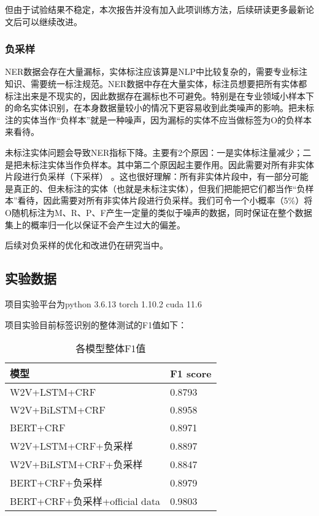 \documentclass{article}
\begin{document}
但由于试验结果不稳定，本次报告并没有加入此项训练方法，后续研读更多最新论文后可以继续改进。

\subsubsection{负采样}
NER数据会存在大量漏标，实体标注应该算是NLP中比较复杂的，需要专业标注知识、需要统一标注规范。NER数据中存在大量实体，标注员想要把所有实体都标注出来是不现实的，因此数据存在漏标也不可避免。特别是在专业领域小样本下的命名实体识别，在本身数据量较小的情况下更容易收到此类噪声的影响。把未标注的实体当作“负样本”就是一种噪声，因为漏标的实体不应当做标签为O的负样本来看待。

未标注实体问题会导致NER指标下降。主要有2个原因：一是实体标注量减少；二是把未标注实体当作负样本。其中第二个原因起主要作用。因此需要对所有非实体片段进行负采样（下采样）\cite{li2020empirical} 。这也很好理解：所有非实体片段中，有一部分可能是真正的、但未标注的实体（也就是未标注实体），但我们把能把它们都当作“负样本”看待，因此需要对所有非实体片段进行负采样。我们可令一个小概率（5\%）将O随机标注为M、R、P、F产生一定量的类似于噪声的数据，同时保证在整个数据集上的概率归一化以保证不会产生过大的偏差。

后续对负采样的优化和改进仍在研究当中。

\newpage
\begin{center}
	\section{实验数据}
\end{center}

项目实验平台为python 3.6.13 torch 1.10.2 cuda 11.6

项目实验目前标签识别的整体测试的F1值如下：


\begin{center} 
\begin{table}[h]
	\centering
	\begin{tabular}{l|p{5cm}}
		\hline
		模型&F1 score\\
		\hline
 		W2V+LSTM+CRF&0.8793\\
 		W2V+BiLSTM+CRF&0.8958\\
 		BERT+CRF&0.8971\\
 		W2V+LSTM+CRF+负采样&0.8897\\
 		W2V+BiLSTM+CRF+负采样&0.8847\\
 		BERT+CRF+负采样&0.8979\\
 		BERT+CRF+负采样+official data&0.9803
	\end{tabular}
	\caption{各模型整体F1值}
\end{table}
\end{center}
\end{document}
